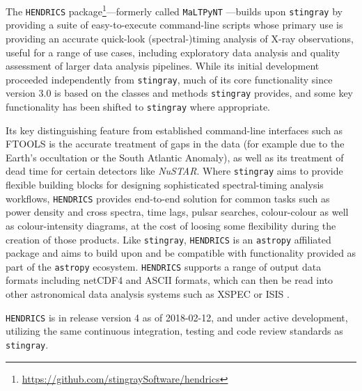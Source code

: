 \documentclass[twocolumn]{aastex62}
\newcommand{\project}[1]{\textsl{#1}\xspace}
\newcommand{\nustar}{\project{NuSTAR}\xspace}
\newcommand{\stingray}{\texttt{stingray}\xspace}
\newcommand{\astropy}{\texttt{astropy}\xspace}
\newcommand{\hendrics}{\texttt{HENDRICS}\xspace}
\begin{document}
The \hendrics package\footnote{\url{https://github.com/stingraySoftware/hendrics}}---formerly called \texttt{MaLTPyNT} \citep{bachetti2015b}---builds upon \stingray by providing a suite of easy-to-execute command-line scripts whose primary use is providing an accurate quick-look (spectral-)timing analysis of X-ray observations, useful for a range of use cases, including exploratory data analysis and quality assessment of larger data analysis pipelines. While its initial development proceeded independently from \stingray, much of its core functionality since version 3.0 is based on the classes and methods \stingray provides, and some key functionality has been shifted to \stingray where appropriate. 

Its key distinguishing feature from established command-line interfaces such as FTOOLS is the accurate treatment of gaps in the data (for example due to the Earth's occultation or the South Atlantic Anomaly), as well as its treatment of dead time for certain detectors like \nustar. Where \stingray aims to provide flexible building blocks for designing sophisticated spectral-timing analysis workflows, \hendrics provides end-to-end solution for common tasks such as power density and cross spectra, time lags, pulsar searches, colour-colour as well as colour-intensity diagrams, at the cost of loosing some flexibility during the creation of those products. Like \stingray, \hendrics is an \astropy affiliated package and aims to build upon and be compatible with functionality provided as part of the \astropy ecosystem.
\hendrics supports a range of output data formats including netCDF4 and ASCII formats, which can then be read into other astronomical data analysis systems such as XSPEC \citep{arnaud1996} or ISIS  \citep{houck2000}.

\hendrics is in release version 4 as of 2018-02-12, and under active development, utilizing the same continuous integration, testing and code review standards as \stingray.
\end{document}

